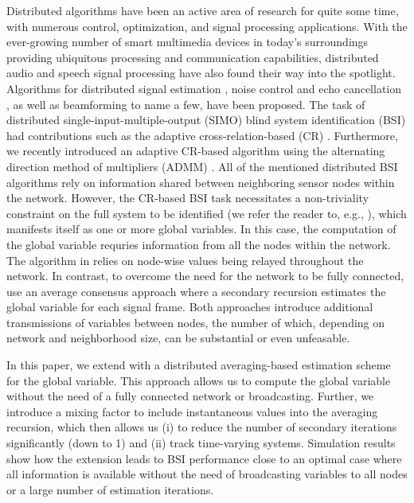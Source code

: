 \documentclass{article}
\begin{document}
Distributed algorithms have been an active area of research for quite some time, with numerous control, optimization, and signal processing applications.
With the ever-growing number of smart multimedia devices in today's surroundings providing ubiquitous processing and communication capabilities, distributed audio and speech signal processing have also found their way into the spotlight.
Algorithms for distributed signal estimation \cite{5483092}, noise control and echo cancellation \cite{9670697}, as well as beamforming \cite{6663655,6329934,MARKOVICHGOLAN20154} to name a few, have been proposed.
The task of distributed single-input-multiple-output (SIMO) blind system identification (BSI) had contributions such as the adaptive cross-relation-based (CR) \cite{yuDistributedBlindSystem2014, liuDistributedBlindIdentification2016}.
Furthermore, we recently introduced an adaptive CR-based algorithm \cite{blochbergerDBSI} using the alternating direction method of multipliers (ADMM) \cite{boydDistributedOptimizationStatistical2011}.
All of the mentioned distributed BSI algorithms rely on information shared between neighboring sensor nodes within the network.
However, the CR-based BSI task necessitates a non-triviality constraint on the full system to be identified (we refer the reader to, e.g., \cite{huangAdaptiveMultichannelLeast2002,huangClassFrequencydomainAdaptive2003}), which manifests itself as one or more global variables.
In this case, the computation of the global variable requries information from all the nodes within the network.
The algorithm in \cite{blochbergerDBSI} relies on node-wise values being relayed throughout the network.
In contrast, to overcome the need for the network to be fully connected, \cite{yuDistributedBlindSystem2014, liuDistributedBlindIdentification2016} use an average consensus \cite{xiaoFastLinearIterations2004} approach where a secondary recursion estimates the global variable for each signal frame.
Both approaches introduce additional transmissions of variables between nodes, the number of which, depending on network and neighborhood size, can be substantial or even unfeasable.

In this paper, we extend \cite{blochbergerDBSI} with a distributed averaging-based \cite{xiaoFastLinearIterations2004} estimation scheme for the global variable.
This approach allows us to compute the global variable without the need of a fully connected network or broadcasting.
Further, we introduce a mixing factor to include instantaneous values into the averaging recursion, which then allows us (i) to reduce the number of secondary iterations significantly (down to 1) and (ii) track time-varying systems.
Simulation results show how the extension leads to BSI performance close to an optimal case where all information is available without the need of broadcasting variables to all nodes or a large number of estimation iterations.
\end{document}
